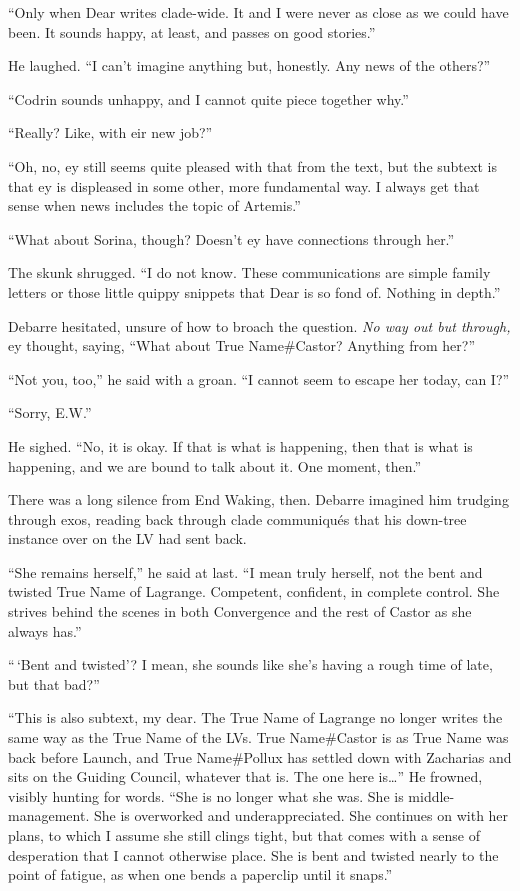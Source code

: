 ``Only when Dear writes clade-wide. It and I were never as close as we could have been. It sounds happy, at least, and passes on good stories.''

He laughed. ``I can't imagine anything but, honestly. Any news of the others?''

``Codrin sounds unhappy, and I cannot quite piece together why.''

``Really? Like, with eir new job?''

``Oh, no, ey still seems quite pleased with that from the text, but the subtext is that ey is displeased in some other, more fundamental way. I always get that sense when news includes the topic of Artemis.''

``What about Sorina, though? Doesn't ey have connections through her.''

The skunk shrugged. ``I do not know. These communications are simple family letters or those little quippy snippets that Dear is so fond of. Nothing in depth.''

Debarre hesitated, unsure of how to broach the question. \emph{No way out but through,} ey thought, saying, ``What about True Name\#Castor? Anything from her?''

``Not you, too,'' he said with a groan. ``I cannot seem to escape her today, can I?''

``Sorry, E.W.''

He sighed. ``No, it is okay. If that is what is happening, then that is what is happening, and we are bound to talk about it. One moment, then.''

There was a long silence from End Waking, then. Debarre imagined him trudging through exos, reading back through clade communiqués that his down-tree instance over on the LV had sent back.

``She remains herself,'' he said at last. ``I mean truly herself, not the bent and twisted True Name of Lagrange. Competent, confident, in complete control. She strives behind the scenes in both Convergence and the rest of Castor as she always has.''

``\,`Bent and twisted'? I mean, she sounds like she's having a rough time of late, but that bad?''

``This is also subtext, my dear. The True Name of Lagrange no longer writes the same way as the True Name of the LVs. True Name\#Castor is as True Name was back before Launch, and True Name\#Pollux has settled down with Zacharias and sits on the Guiding Council, whatever that is. The one here is\ldots{}'' He frowned, visibly hunting for words. ``She is no longer what she was. She is middle-management. She is overworked and underappreciated. She continues on with her plans, to which I assume she still clings tight, but that comes with a sense of desperation that I cannot otherwise place. She is bent and twisted nearly to the point of fatigue, as when one bends a paperclip until it snaps.''

